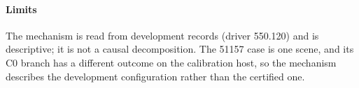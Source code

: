 \paragraph{Limits} The mechanism is read from development records (driver 550.120) and is descriptive; it is not a causal decomposition. The 51157 case is one scene, and its C0 branch has a different outcome on the calibration host, so the mechanism describes the development configuration rather than the certified one.

